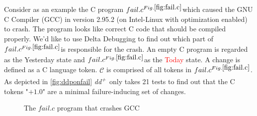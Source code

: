 \documentclass[a4paper,UKenglish]{lipics-v2018}
\newcommand{\ddp}{\textit{dd\textsuperscript{+}}}
\newcommand{\green}[1]{\textcolor{td-green}{#1}}
\newcommand{\red}[1]{\textcolor{red}{#1}}
\newcommand{\yd}[0]{\green{Yesterday} }
\newcommand{\td}[0]{\red{Today} }
\newcommand{\C}[0]{\ensuremath{\mathcal{C}}}
\newcommand{\reffail}[0]{\href{fig:fail.c}{\ensuremath{fail.c^{Fig. \ref{fig:fail.c}}}}}
\begin{document}
Consider as an example the C program \reffail which caused the GNU C Compiler (GCC) in version 2.95.2 (on Intel-Linux with optimization enabled) to crash. The program looks like correct C code that should be compiled properly. We'd like to use Delta Debugging to find out which part of \reffail is responsible for the crash. An empty C program is regarded as the \yd state and \reffail as the \td state. A change is defined as a C language token. $\C$ is comprised of all tokens in \reffail. As depicted in \ref{fig:ddponfail} \ddp\ only takes 21 tests to find out that the C tokens "$+ 1.0$" are a minimal failure-inducing set of changes.
\\
\begin{figure}[h!]
	\caption{The $fail.c$ program that crashes GCC}
	\label{fig:fail.c}
\end{figure}
\\
\end{document}
